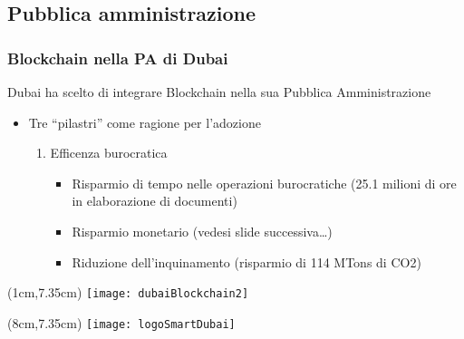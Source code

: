 \subsection{Pubblica amministrazione}
\begin{frame}
 \frametitle{Blockchain nella PA di Dubai}

 Dubai ha scelto di integrare Blockchain nella sua Pubblica Amministrazione
 \begin{itemize}
  \item<1-> Tre ``pilastri'' come ragione per l'adozione
  \begin{enumerate}
   \item<2-> Efficenza burocratica
   \begin{itemize}
   \item<3-> Risparmio di tempo nelle operazioni burocratiche (25.1 milioni di
ore in elaborazione di documenti)
   \item<4-> Risparmio monetario (vedesi slide successiva\dots)
   \item<5-> Riduzione dell'inquinamento (risparmio di 114 MTons di CO2)
  \end{itemize}
  \end{enumerate}

 \end{itemize}


 \begin{textblock*}{5cm}(1cm,7.35cm)
  \texttt{[image: dubaiBlockchain2]}
 \end{textblock*}

 \begin{textblock*}{5cm}(8cm,7.35cm)
  \texttt{[image: logoSmartDubai]}
 \end{textblock*}

\end{frame}

